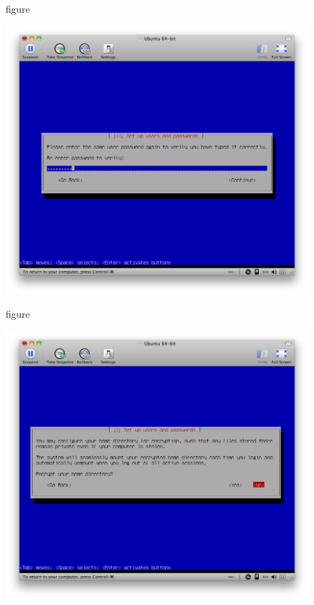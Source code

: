 \begin{nofloat}{figure}
\begin{center}
\includegraphics[width=0.85\textwidth]{screenshots/31_ubuntu_install.png}
\end{center}
\end{nofloat}

\begin{nofloat}{figure}
\begin{center}
\includegraphics[width=0.85\textwidth]{screenshots/32_ubuntu_install.png}
\end{center}
\end{nofloat}

